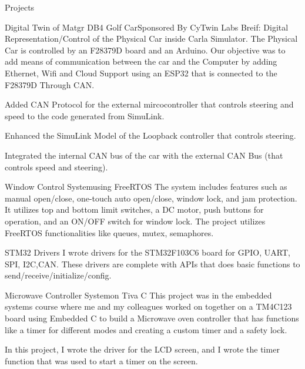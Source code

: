 \documentclass{resume}
\begin{document}
\begin{rSection}{Projects}

\begin{rSubsection}{Digital Twin of Matgr DB4 Golf Car}{}{Sponsored By CyTwin Labs}{}
Breif: Digital Representation/Control of the Physical Car inside Carla Simulator. The Physical Car is controlled by an F28379D board and an Arduino. Our objective was to add means of communication between the car and the Computer by adding Ethernet, Wifi and Cloud Support using an ESP32 that is connected to the F28379D Through CAN.
\item Added CAN Protocol for the external mircocontroller that controls steering and speed to the code generated from SimuLink.
\item Enhanced the SimuLink Model of the Loopback controller that controls steering. 
\item Integrated the internal CAN bus of the car with the external CAN Bus (that controls speed and steering).

\end{rSubsection}


\begin{rSubsection}{Window Control System}{}{using FreeRTOS}{}
The system includes features such as manual open/close, one-touch auto open/close, window lock, and jam protection. It utilizes top and bottom limit switches, a DC motor, push buttons for operation, and an ON/OFF switch for window lock. The project utilizes FreeRTOS functionalities like queues, mutex, semaphores.
\end{rSubsection}


\begin{rSubsection}{STM32 Drivers}{}{}{}
I wrote drivers for the STM32F103C6 board for GPIO, UART, SPI, I2C,CAN. These drivers are complete with APIs that does basic functions to send/receive/initialize/config.
\end{rSubsection}

\begin{rSubsection}{Microwave Controller System}{}{on Tiva C}{}
This project was in the embedded systems course where me and my colleagues worked on together on a TM4C123 board using Embedded C to build a Microwave oven controller that has functions like a timer for different modes and creating a custom timer and a safety lock.

In this project, I wrote the driver for the LCD screen, and I wrote the timer function that was used to start a timer on the screen.
\\ \\
\end{rSubsection}



\end{rSection}
\end{document}
